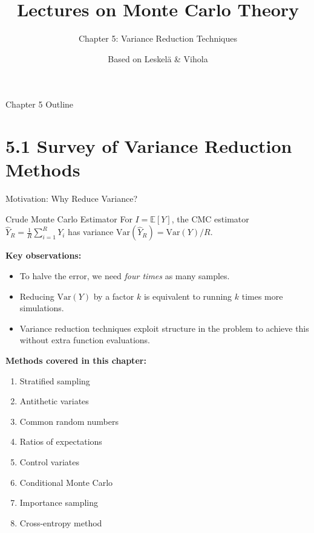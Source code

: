 \documentclass[aspectratio=169,10pt]{beamer}
\title[MC Theory -- Ch.5]{Lectures on Monte Carlo Theory}
\subtitle{Chapter 5: Variance Reduction Techniques}
\author{Based on Leskel\"{a} \& Vihola}
\date{}
\begin{document}
\begin{frame}
  \titlepage
\end{frame}

\begin{frame}{Chapter 5 Outline}
  \tableofcontents
\end{frame}

\section{5.1 Survey of Variance Reduction Methods}

\begin{frame}{Motivation: Why Reduce Variance?}

  \begin{block}{Crude Monte Carlo Estimator}
    For $I = \mathbb{E}[Y]$, the CMC estimator $\hat{Y}_R = \frac{1}{R}\sum_{i=1}^R Y_i$
    has variance $\mathrm{Var}(\hat{Y}_R) = \mathrm{Var}(Y)/R$.
  \end{block}

  \medskip
  \textbf{Key observations:}
  \begin{itemize}
    \item To halve the error, we need \emph{four times} as many samples.
    \item Reducing $\mathrm{Var}(Y)$ by a factor $k$ is equivalent to
          running $k$ times more simulations.
    \item Variance reduction techniques exploit structure in the problem
          to achieve this without extra function evaluations.
  \end{itemize}

  \medskip
  \textbf{Methods covered in this chapter:}
  \begin{enumerate}
    \item Stratified sampling
    \item Antithetic variates
    \item Common random numbers
    \item Ratios of expectations
    \item Control variates
    \item Conditional Monte Carlo
    \item Importance sampling
    \item Cross-entropy method
  \end{enumerate}
\end{frame}
\end{document}
